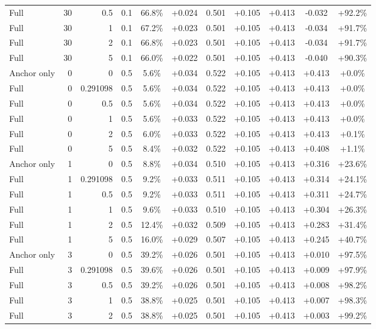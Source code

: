 \begin{table}[htbp]
\begin{tabular}{lrrrccccccc}
Full & 30 & 0.5 & 0.1 & 66.8\% & +0.024 & 0.501 & +0.105 & +0.413 & -0.032 & +92.2\% \\
Full & 30 & 1 & 0.1 & 67.2\% & +0.023 & 0.501 & +0.105 & +0.413 & -0.034 & +91.7\% \\
Full & 30 & 2 & 0.1 & 66.8\% & +0.023 & 0.501 & +0.105 & +0.413 & -0.034 & +91.7\% \\
Full & 30 & 5 & 0.1 & 66.0\% & +0.022 & 0.501 & +0.105 & +0.413 & -0.040 & +90.3\% \\
Anchor only & 0 & 0 & 0.5 & 5.6\% & +0.034 & 0.522 & +0.105 & +0.413 & +0.413 & +0.0\% \\
Full & 0 & 0.291098 & 0.5 & 5.6\% & +0.034 & 0.522 & +0.105 & +0.413 & +0.413 & +0.0\% \\
Full & 0 & 0.5 & 0.5 & 5.6\% & +0.034 & 0.522 & +0.105 & +0.413 & +0.413 & +0.0\% \\
Full & 0 & 1 & 0.5 & 5.6\% & +0.033 & 0.522 & +0.105 & +0.413 & +0.413 & +0.0\% \\
Full & 0 & 2 & 0.5 & 6.0\% & +0.033 & 0.522 & +0.105 & +0.413 & +0.413 & +0.1\% \\
Full & 0 & 5 & 0.5 & 8.4\% & +0.032 & 0.522 & +0.105 & +0.413 & +0.408 & +1.1\% \\
Anchor only & 1 & 0 & 0.5 & 8.8\% & +0.034 & 0.510 & +0.105 & +0.413 & +0.316 & +23.6\% \\
Full & 1 & 0.291098 & 0.5 & 9.2\% & +0.033 & 0.511 & +0.105 & +0.413 & +0.314 & +24.1\% \\
Full & 1 & 0.5 & 0.5 & 9.2\% & +0.033 & 0.511 & +0.105 & +0.413 & +0.311 & +24.7\% \\
Full & 1 & 1 & 0.5 & 9.6\% & +0.033 & 0.510 & +0.105 & +0.413 & +0.304 & +26.3\% \\
Full & 1 & 2 & 0.5 & 12.4\% & +0.032 & 0.509 & +0.105 & +0.413 & +0.283 & +31.4\% \\
Full & 1 & 5 & 0.5 & 16.0\% & +0.029 & 0.507 & +0.105 & +0.413 & +0.245 & +40.7\% \\
Anchor only & 3 & 0 & 0.5 & 39.2\% & +0.026 & 0.501 & +0.105 & +0.413 & +0.010 & +97.5\% \\
Full & 3 & 0.291098 & 0.5 & 39.6\% & +0.026 & 0.501 & +0.105 & +0.413 & +0.009 & +97.9\% \\
Full & 3 & 0.5 & 0.5 & 39.2\% & +0.026 & 0.501 & +0.105 & +0.413 & +0.008 & +98.2\% \\
Full & 3 & 1 & 0.5 & 38.8\% & +0.025 & 0.501 & +0.105 & +0.413 & +0.007 & +98.3\% \\
Full & 3 & 2 & 0.5 & 38.8\% & +0.025 & 0.501 & +0.105 & +0.413 & +0.003 & +99.2\% \\

\end{tabular}
\end{table}
